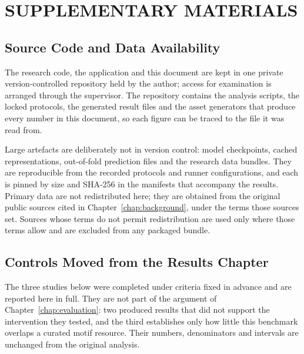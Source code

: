 \chapter{SUPPLEMENTARY MATERIALS}\label{app:supplementary}

\section{Source Code and Data Availability}
The research code, the application and this document are kept in one private version-controlled
repository held by the author; access for examination is arranged through the supervisor. The
repository contains the analysis scripts, the locked protocols, the generated result files and the
asset generators that produce every number in this document, so each figure can be traced to the
file it was read from.

Large artefacts are deliberately not in version control: model checkpoints, cached representations,
out-of-fold prediction files and the research data bundles. They are reproducible from the recorded
protocols and runner configurations, and each is pinned by size and SHA-256 in the manifests that
accompany the results. Primary data are not redistributed here; they are obtained from the original
public sources cited in Chapter~\ref{chap:background}, under the terms those sources set. Sources
whose terms do not permit redistribution are used only where those terms allow and are excluded from
any packaged bundle.

\section{Controls Moved from the Results Chapter}
The three studies below were completed under criteria fixed in advance and are reported here in full.
They are not part of the argument of Chapter~\ref{chap:evaluation}: two produced results that did not
support the intervention they tested, and the third establishes only how little this benchmark
overlaps a curated motif resource. Their numbers, denominators and intervals are unchanged from the
original analysis.

